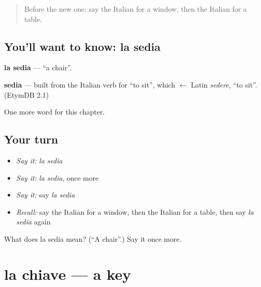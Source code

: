 \label{lesson:IT-C56-sedia}



\begin{quote}
Before the new one: say the Italian for a window, then the Italian for a table.
\end{quote}

\subsection*{You'll want to know: la sedia}
\textbf{la sedia} — \textquotedblleft{}a chair\textquotedblright{}.

\begin{cousinweb}
\textbf{sedia} — built from the Italian verb for \textquotedblleft{}to sit\textquotedblright{}, which $\leftarrow$ Latin \emph{sedere}, \textquotedblleft{}to sit\textquotedblright{}. (EtymDB 2.1)
\end{cousinweb}

\begin{grammarlens}[title={What you've built}]
One more word for this chapter.
\end{grammarlens}

\subsection*{Your turn}
\begin{itemize}
\raggedright
  \item \emph{Say it:} \emph{la sedia}
  \item \emph{Say it:} \emph{la sedia}, once more
  \item \emph{Say it:} say \emph{la sedia}
  \item \emph{Recall:} say the Italian for a window, then the Italian for a table, then say \emph{la sedia} again
\end{itemize}

\begin{tcolorbox}[breakable,colback=teal!4,colframe=teal!35!black,title={Before you move on}]
What does la sedia mean? (\textquotedblleft{}A chair\textquotedblright{}.) Say it once more.
\end{tcolorbox}
\section[la chiave]{la chiave — a key}

\label{lesson:IT-C56-chiave}



